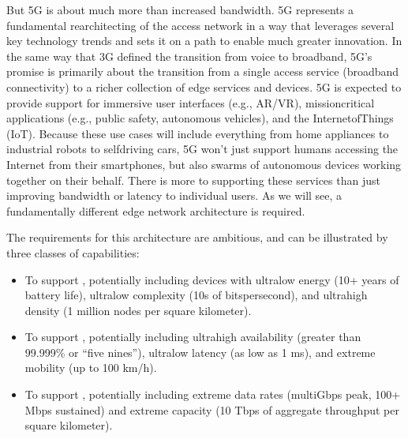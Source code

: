\documentclass[a4paper,11pt,english]{sphinxmanual}
\begin{document}
\sphinxAtStartPar
But 5G is about much more than increased bandwidth. 5G represents a
fundamental rearchitecting of the access network in a way that
leverages several key technology trends and sets it on a path to enable
much greater innovation. In the same way that 3G
defined the transition from voice to broadband, 5G’s promise is primarily
about the transition from a single access service (broadband
connectivity) to a richer collection of edge services and devices. 5G
is expected to provide support for immersive user interfaces (e.g., AR/VR),
mission\sphinxhyphen{}critical applications (e.g., public safety, autonomous
vehicles), and the Internet\sphinxhyphen{}of\sphinxhyphen{}Things (IoT). Because these use cases
will include everything from home appliances to industrial robots to
self\sphinxhyphen{}driving cars, 5G won’t just support humans accessing the Internet
from their smartphones, but also swarms of autonomous devices working
together on their behalf. There is more to supporting these services
than just improving bandwidth or latency to individual users. As we will see, a fundamentally
different edge network architecture is required.

\sphinxAtStartPar
The requirements for this architecture are ambitious, and can be
illustrated by three classes of capabilities:
\begin{itemize}
\item {} 
\sphinxAtStartPar
To support , potentially including
devices with ultra\sphinxhyphen{}low energy (10+ years of battery life), ultra\sphinxhyphen{}low
complexity (10s of bits\sphinxhyphen{}per\sphinxhyphen{}second), and ultra\sphinxhyphen{}high density (1
million nodes per square kilometer).

\item {} 
\sphinxAtStartPar
To support , potentially including
ultra\sphinxhyphen{}high availability (greater than 99.999\% or “five nines”),
ultra\sphinxhyphen{}low latency (as low as 1 ms), and extreme mobility (up to 100
km/h).

\item {} 
\sphinxAtStartPar
To support , potentially including extreme data rates
(multi\sphinxhyphen{}Gbps peak, 100+ Mbps sustained) and extreme
capacity (10 Tbps of aggregate throughput per square kilometer).

\end{itemize}
\end{document}
